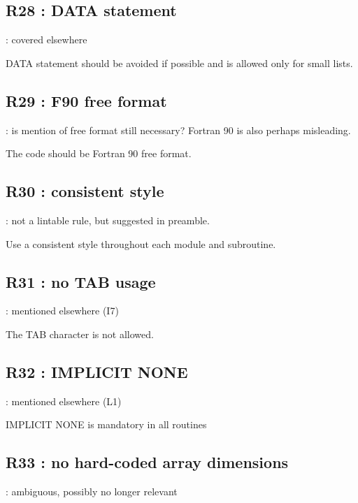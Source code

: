 \documentclass[letterpaper,10pt,english]{sphinxmanual}
\begin{document}
\subsection{R28 :  DATA statement}
\label{\detokenize{obsolescent/r28:r28-data-statement}}\label{\detokenize{obsolescent/r28::doc}}
 : covered elsewhere

DATA statement should be avoided if possible and is allowed only for small lists.


\subsection{R29 :  F90 free format}
\label{\detokenize{obsolescent/r29:r29-f90-free-format}}\label{\detokenize{obsolescent/r29::doc}}
 : is mention of free format still necessary? Fortran 90 is also perhaps misleading.

The code should be Fortran 90 free format.


\subsection{R30 :  consistent style}
\label{\detokenize{obsolescent/r30:r30-consistent-style}}\label{\detokenize{obsolescent/r30::doc}}
 : not a lintable rule, but suggested in preamble.

Use a consistent style throughout each module and subroutine.


\subsection{R31 :  no TAB usage}
\label{\detokenize{obsolescent/r31:r31-no-tab-usage}}\label{\detokenize{obsolescent/r31::doc}}
 : mentioned elsewhere (I7)

The TAB character is not allowed.


\subsection{R32 : IMPLICIT NONE}
\label{\detokenize{obsolescent/r32:r32-implicit-none}}\label{\detokenize{obsolescent/r32::doc}}
 : mentioned elsewhere (L1)

IMPLICIT NONE is mandatory in all routines


\subsection{R33 : no hard-coded array dimensions}
\label{\detokenize{obsolescent/r33:r33-no-hard-coded-array-dimensions}}\label{\detokenize{obsolescent/r33::doc}}
 : ambiguous, possibly no longer relevant
\end{document}
